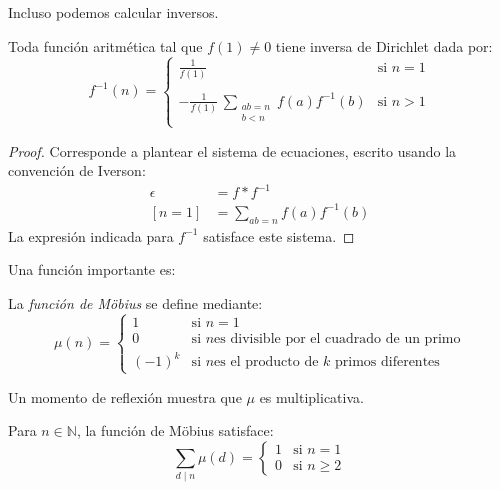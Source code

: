   Incluso podemos calcular inversos.
  \begin{lemma}
    \label{lem:Dirichlet-inverse}
    Toda función aritmética tal que \(f(1) \ne 0\)
    tiene inversa de Dirichlet
    dada por:
    \begin{equation*}
      f^{-1}(n)
	= \begin{cases}
	    \displaystyle
		 \frac{1}{f(1)}
	       & \text{si \(n = 1\)} \\
	    \\
	    \displaystyle
		 - \frac{1}{f(1)}
		     \, \sum_{\substack{a b = n \\ b < n}}
				    f(a) f^{-1}(b)
	       & \text{si \(n > 1\)}
	  \end{cases}
    \end{equation*}
  \end{lemma}
  \begin{proof}
    Corresponde a plantear el sistema de ecuaciones,
    escrito usando la convención de Iverson:
    \begin{align*}
      \epsilon
	&= f * f^{-1} \\
      [n = 1]
	&= \sum_{a b = n} f(a) f^{-1}(b)
    \end{align*}
    La expresión indicada para \(f^{-1}\) satisface este sistema.
  \end{proof}
  Una función importante es:
  \begin{definition}
    La \emph{función de Möbius}
    se define mediante:
    \begin{equation}
      \label{eq:Moebius-mu}
      \mu(n)
	= \begin{cases}
	    1	   &
	       \text{si \(n = 1\)} \\
	    0	   &
	       \text{si \(n\)
		     es divisible por el cuadrado de un primo} \\
	    (-1)^k &
	       \text{si \(n\)
		     es el producto de \(k\) primos diferentes}
	  \end{cases}
    \end{equation}
  \end{definition}
  Un momento de reflexión muestra que \(\mu\) es multiplicativa.
  \begin{lemma}
    \label{lem:sum-mu}
    Para \(n \in \mathbb{N}\),
    la función de Möbius satisface:
    \begin{equation*}
      \sum_{d \mid n} \mu(d)
	= \begin{cases}
	    1 & \text{si \(n = 1\)} \\
	    0 & \text{si \(n \ge 2\)}
	  \end{cases}
    \end{equation*}
  \end{lemma}
